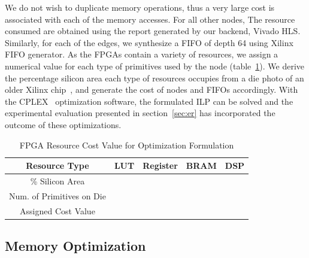 We do not wish to duplicate memory operations, thus a very large cost
is associated with each of the memory accesses. For all other nodes,
The resource consumed are obtained using the report generated
by our backend, Vivado HLS. 
Similarly, for each of the edges, we synthesize a FIFO of depth 64 using Xilinx FIFO generator. 
As the FPGAs contain a variety of resources,
we assign a numerical value for each type of primitives used by the node (table~\ref{tab:resourcecost}). We derive the percentage silicon area
each type of resources occupies from a die photo of an older Xilinx chip~\cite{},
and generate the cost of nodes and FIFOs accordingly. 
With the CPLEX~\cite{iILO06a} optimization software, the formulated ILP can be solved and the experimental evaluation presented in section~\ref{sec:er} has incorporated the outcome of these optimizations.

\begin{table}[htbp]
\caption{FPGA Resource Cost Value for Optimization Formulation}
\centering
\begin{tabular}{| c | c | c | c | c | }
  \hline            
 \cline{3-5} 
  Resource Type     & LUT& Register & BRAM & DSP    \\
  \hline    
  \cline{3-5}
  \% Silicon Area & & & &\\
  \hline     
  \cline{3-5}
  Num. of Primitives on Die & & & &\\
  \hline     
  
  Assigned Cost Value & & & & \\
\hline                                                                                                           

\end{tabular}
\label{tab:resourcecost}

\end{table}





\subsection{Memory Optimization}
\label{sec:optmem}
